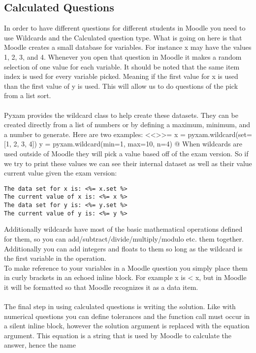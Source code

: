 \documentclass[12pt]{exam}
\begin{document}
\subsection*{Calculated Questions}
In order to have different questions for different students in Moodle you need to use Wildcards and the Calculated
question type. What is going on here is that Moodle creates a small database for variables. For instance {x} may have
the values 1, 2, 3, and 4. Whenever you open that question in Moodle it makes a random selection of one value for each
variable. It should be noted that the same item index is used for every variable picked. Meaning if the first value for
{x} is used than the first value of {y} is used. This will allow us to do questions of the pick from a list sort.
\\\\
Pyxam provides the wildcard class to help create these datasets. They can be created directly from a list of numbers or
by defining a maximum, minimum, and a number to generate. Here are two examples:
<<>>=
x = pyxam.wildcard(set=[1, 2, 3, 4])
y = pyxam.wildcard(min=1, max=10, n=4)
@
When wildcards are used outside of Moodle they will pick a value based off of the exam version. So if we try to print
these values we can see their internal dataset as well as their value current value given the exam version:
\begin{verbatim}
The data set for x is: <%= x.set %>
The current value of x is: <%= x %>
The data set for y is: <%= y.set %>
The current value of y is: <%= y %>
\end{verbatim}
Additionally wildcards have most of the basic mathematical operations defined for
them, so you can add/subtract/divide/multiply/modulo etc. them together. Additionally you can add integers and floats to
them so long as the wildcard is the first variable in the operation.
\\
To make reference to your variables in a Moodle question you simply place them in curly brackets in an echoed inline
block. For example x is <%
x, but in Moodle it will be formatted so that Moodle recognizes it as a data item.
\\\\
The final step in using calculated questions is writing the solution. Like with numerical questions you can define
tolerances and the function call must occur in a silent inline block, however the solution argument is replaced with the
equation argument. This equation is a string that is used by Moodle to calculate the answer, hence the name
\end{document}
